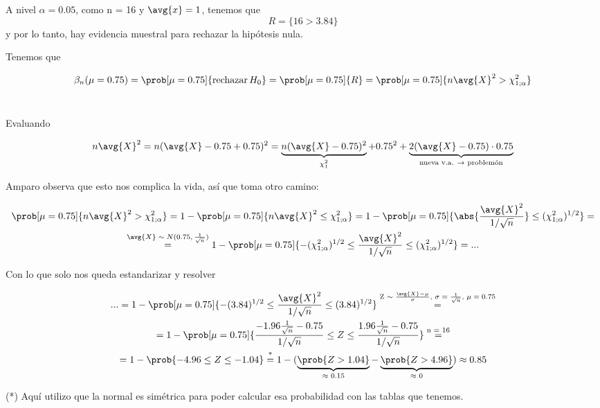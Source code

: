 \begin{problem}[5]
A nivel $\alpha = 0.05$, como n = 16 y $\avg{x} = 1$, tenemos que
\[ R = \{ 16 > 3.84 \} \]
y por lo tanto, hay evidencia muestral para rechazar la hipótesis nula.

\spart Tenemos que

\[
\beta_n(\mu = 0.75) =
\prob[\mu = 0.75]{\mathrm{rechazar}\,H_0} =
\prob[\mu = 0.75]{R} =
\prob[\mu = 0.75]{n\avg{X}^2 > \chi_{1;\alpha}^2}
\] 

Evaluando

\[
n\avg{X}^2 =
n(\avg{X} - 0.75 + 0.75)^2 =
\underbrace{n(\avg{X} - 0.75)^2}_\text{$\chi^2_1$} +
0.75^2 +
\underbrace{2(\avg{X} - 0.75)\cdot 0.75}_\text{nueva v.a. $\rightarrow$ problemón}
\]

Amparo observa que esto nos complica la vida, así que toma otro camino:

\begin{gather*}
\prob[\mu = 0.75]{n\avg{X}^2 > \chi_{1;\alpha}^2} =
1 - \prob[\mu = 0.75]{n\avg{X}^2 \leq \chi_{1;\alpha}^2} =
1 - \prob[\mu = 0.75]{\abs{\frac{\avg{X}^2}{1/\sqrt{n}}} \leq (\chi_{1;\alpha}^2)^{1/2}} =\\
\stackrel{\text{$\avg{X} \sim N(0.75, \frac{1}{\sqrt{n}})$}}{=}
1 - \prob[\mu = 0.75]{-(\chi_{1;\alpha}^2)^{1/2} \leq \frac{\avg{X}^2}{1/\sqrt{n}} \leq (\chi_{1;\alpha}^2)^{1/2}} = ...
\end{gather*}

Con lo que solo nos queda estandarizar y resolver

\begin{gather*}
... =
1 - \prob[\mu = 0.75]{-(3.84)^{1/2} \leq \frac{\avg{X}^2}{1/\sqrt{n}} \leq (3.84)^{1/2}}
\stackrel{\text{Z $\sim \frac{\avg{X} - \mu}{\sigma}$, $\sigma = \frac{1}{\sqrt{n}}$, $\mu = 0.75$}}{=}\\
= 1 - \prob[\mu = 0.75]{\frac{-1.96\frac{1}{\sqrt{n}} - 0.75}{1/\sqrt{n}} \leq Z \leq \frac{1.96\frac{1}{\sqrt{n}} - 0.75}{1/\sqrt{n}}}
\stackrel{\text{n = 16}}{=}\\
= 1 - \prob{-4.96 \leq Z \leq -1.04}
\stackrel{\text{*}}{=}
1 - (\underbrace{\prob{Z > 1.04}}_\text{$\approx$ 0.15} - \underbrace{\prob{Z > 4.96}}_\text{$\approx$ 0})
\approx 0.85
\end{gather*}

(*) Aquí utilizo que la normal es simétrica para poder calcular esa probabilidad con las tablas que tenemos.

\end{problem}
